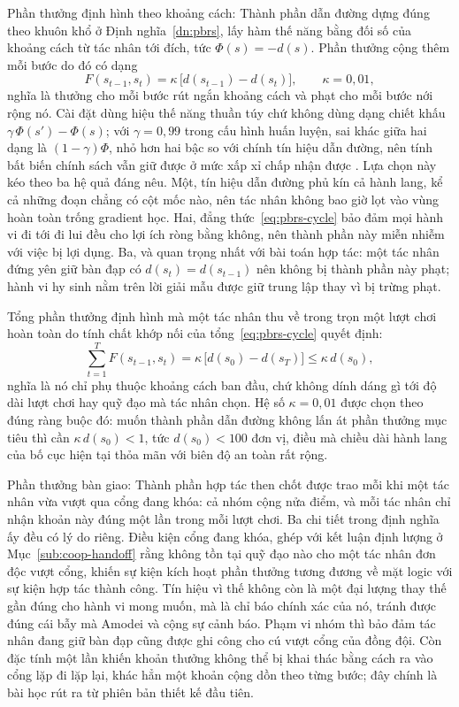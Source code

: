 \indent Phần thưởng định hình theo khoảng cách: Thành phần dẫn đường dựng đúng
theo khuôn khổ ở Định nghĩa~\ref{dn:pbrs}, lấy hàm thế năng bằng đối số của khoảng cách từ
tác nhân tới đích, tức $\Phi(s) = -d(s)$. Phần thưởng cộng thêm mỗi bước do đó có dạng
\begin{equation}
F(s_{t-1}, s_t) = \kappa\,\bigl[d(s_{t-1}) - d(s_t)\bigr], \qquad \kappa = 0{,}01 ,
\label{eq:ctf-pbrs}
\end{equation}
nghĩa là thưởng cho mỗi bước rút ngắn khoảng cách và phạt cho mỗi bước nới rộng nó. Cài
đặt dùng hiệu thế năng thuần túy chứ không dùng dạng chiết khấu $\gamma\,\Phi(s') -
\Phi(s)$; với $\gamma = 0{,}99$ trong cấu hình huấn luyện, sai khác giữa hai dạng là
$(1-\gamma)\Phi$, nhỏ hơn hai bậc so với chính tín hiệu dẫn đường, nên tính bất biến
chính sách vẫn giữ được ở mức xấp xỉ chấp nhận được \cite{devlin2012dynamic}. Lựa chọn này
kéo theo ba hệ quả đáng nêu. Một, tín hiệu dẫn đường phủ kín cả hành lang, kể cả những
đoạn chẳng có cột mốc nào, nên tác nhân không bao giờ lọt vào vùng hoàn toàn trống
gradient học. Hai, đẳng thức~\eqref{eq:pbrs-cycle} bảo đảm mọi hành vi đi tới đi lui đều
cho lợi ích ròng bằng không, nên thành phần này miễn nhiễm với việc bị lợi dụng. Ba, và
quan trọng nhất với bài toán hợp tác: một tác nhân đứng yên giữ bàn đạp có $d(s_t) =
d(s_{t-1})$ nên không bị thành phần này phạt; hành vi hy sinh nằm trên lời giải mẫu được
giữ trung lập thay vì bị trừng phạt.

\indent Tổng phần thưởng định hình mà một tác nhân thu về trong trọn một lượt chơi hoàn
toàn do tính chất khớp nối của tổng~\eqref{eq:pbrs-cycle} quyết định:
\begin{equation}
\sum_{t=1}^{T} F(s_{t-1}, s_t)
= \kappa\,\bigl[d(s_0) - d(s_T)\bigr] \le \kappa\, d(s_0) ,
\label{eq:ctf-shaping-bound}
\end{equation}
nghĩa là nó chỉ phụ thuộc khoảng cách ban đầu, chứ không dính dáng gì tới độ dài lượt chơi
hay quỹ đạo mà tác nhân chọn. Hệ số $\kappa = 0{,}01$ được chọn theo đúng ràng buộc đó:
muốn thành phần dẫn đường không lấn át phần thưởng mục tiêu thì cần $\kappa\,d(s_0) < 1$,
tức $d(s_0) < 100$ đơn vị, điều mà chiều dài hành lang của bố cục hiện tại thỏa mãn với
biên độ an toàn rất rộng.

\indent Phần thưởng bàn giao: Thành phần hợp tác then chốt được trao mỗi khi một
tác nhân vừa vượt qua cổng đang khóa: cả nhóm cộng nửa điểm, và mỗi tác nhân chỉ nhận
khoản này đúng một lần trong mỗi lượt chơi. Ba chi tiết trong định nghĩa ấy đều có lý do
riêng. Điều kiện cổng đang khóa, ghép với kết luận định lượng ở Mục~\ref{sub:coop-handoff}
rằng không tồn tại quỹ đạo nào cho một tác nhân đơn độc vượt cổng, khiến sự kiện kích hoạt
phần thưởng tương đương về mặt logic với sự kiện hợp tác thành công. Tín hiệu vì thế không
còn là một đại lượng thay thế gần đúng cho hành vi mong muốn, mà là chỉ báo chính xác của nó,
tránh được đúng cái bẫy mà Amodei và cộng sự \cite{amodei2016concrete} cảnh báo. Phạm
vi nhóm thì bảo đảm tác nhân đang giữ bàn đạp cũng được ghi công cho cú vượt cổng của đồng
đội. Còn đặc tính một lần khiến khoản thưởng không thể bị khai thác bằng cách ra vào cổng
lặp đi lặp lại, khác hẳn một khoản cộng dồn theo từng bước; đây chính là bài học rút ra từ
phiên bản thiết kế đầu tiên.

